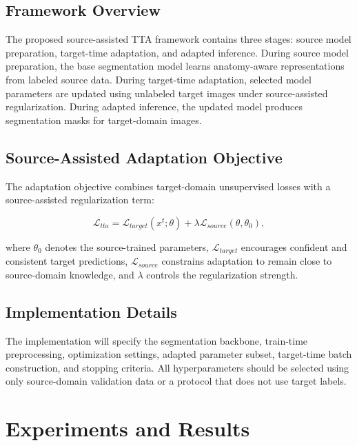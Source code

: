\documentclass[diagnostics,article,submit,pdftex,moreauthors]{Definitions/mdpi}
\begin{document}
\subsection{Framework Overview}

The proposed source-assisted TTA framework contains three stages: source model preparation, target-time adaptation, and adapted inference. During source model preparation, the base segmentation model learns anatomy-aware representations from labeled source data. During target-time adaptation, selected model parameters are updated using unlabeled target images under source-assisted regularization. During adapted inference, the updated model produces segmentation masks for target-domain images.

\subsection{Source-Assisted Adaptation Objective}

The adaptation objective combines target-domain unsupervised losses with a source-assisted regularization term:
\begin{linenomath}
\begin{equation}
\mathcal{L}_{tta} = \mathcal{L}_{target}(x^t;\theta) + \lambda \mathcal{L}_{source}(\theta,\theta_0),
\end{equation}
\end{linenomath}
where $\theta_0$ denotes the source-trained parameters, $\mathcal{L}_{target}$ encourages confident and consistent target predictions, $\mathcal{L}_{source}$ constrains adaptation to remain close to source-domain knowledge, and $\lambda$ controls the regularization strength.

\subsection{Implementation Details}

The implementation will specify the segmentation backbone, train-time preprocessing, optimization settings, adapted parameter subset, target-time batch construction, and stopping criteria. All hyperparameters should be selected using only source-domain validation data or a protocol that does not use target labels.

\section{Experiments and Results}
\end{document}
